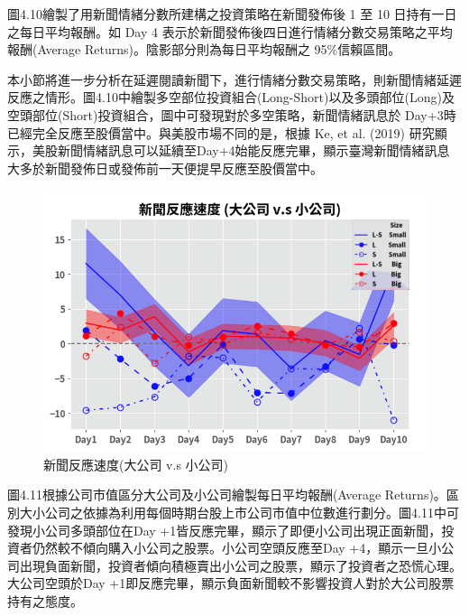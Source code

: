 圖4.10繪製了用新聞情緒分數所建構之投資策略在新聞發佈後 1 至 10 日持有一日之每日平均報酬。如 Day 4 表示於新聞發佈後四日進行情緒分數交易策略之平均報酬(Average Returns)。陰影部分則為每日平均報酬之 95\%信賴區間。

本小節將進一步分析在延遲閱讀新聞下，進行情緒分數交易策略，則新聞情緒延遲反應之情形。圖4.10中繪製多空部位投資組合(Long-Short)以及多頭部位(Long)及空頭部位(Short)投資組合，圖中可發現對於多空策略，新聞情緒訊息於 Day+3時已經完全反應至股價當中。與美股市場不同的是，根據 Ke, et al. (2019) 研究顯示，美股新聞情緒訊息可以延續至Day+4始能反應完畢，顯示臺灣新聞情緒訊息大多於新聞發佈日或發佈前一天便提早反應至股價當中。

\newpage

\begin{figure}[htbp]
\centering
\includegraphics[width=1.1\textwidth]{images/speed2.png}
\caption{新聞反應速度(大公司 v.s 小公司)}
\end{figure}
圖4.11根據公司市值區分大公司及小公司繪製每日平均報酬(Average Returns)。區別大小公司之依據為利用每個時期台股上市公司市值中位數進行劃分。圖4.11中可發現小公司多頭部位在Day +1皆反應完畢，顯示了即便小公司出現正面新聞，投資者仍然較不傾向購入小公司之股票。小公司空頭反應至Day +4，顯示一旦小公司出現負面新聞，投資者傾向積極賣出小公司之股票，顯示了投資者之恐慌心理。大公司空頭於Day +1即反應完畢，顯示負面新聞較不影響投資人對於大公司股票持有之態度。

\newpage


